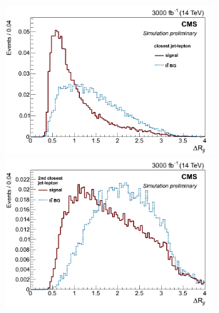 \documentclass[10pt,a4paper]{article}
\newcommand{\ww}{7.7cm} %
\begin{document}
\begin{figure}[h]
	
  \begin{subfigure}[b]{17cm}
    \begin{minipage}[h!]{\ww}
      \centering
      \includegraphics[width=\ww]{figs/DeltaR_j1l.png}
    \end{minipage}
    \begin{minipage}[h!]{\ww}
      \centering
      \includegraphics[width=\ww]{figs/DeltaR_j2l.png}
    \end{minipage}
  \end{subfigure}


\end{figure}
\end{document}

